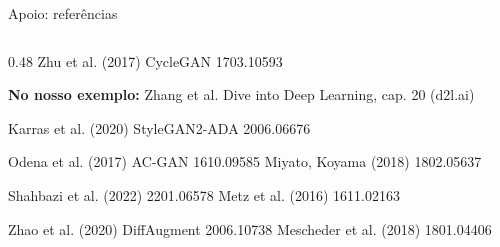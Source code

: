 \documentclass[aspectratio=169,t]{beamer}
\begin{document}
\begin{frame}{Apoio: referências}
\begin{columns}[T,onlytextwidth]
\begin{column}{0.48\textwidth}
      Zhu et al. (2017) CycleGAN 1703.10593\par\smallskip
      \textbf{No nosso exemplo:} Zhang et al. Dive into Deep Learning, cap. 20 (d2l.ai)\par\smallskip
      Karras et al. (2020) StyleGAN2-ADA 2006.06676\par\smallskip
      Odena et al. (2017) AC-GAN 1610.09585 \textperiodcentered{} Miyato, Koyama (2018) 1802.05637\par\smallskip
      Shahbazi et al. (2022) 2201.06578 \textperiodcentered{} Metz et al. (2016) 1611.02163\par\smallskip
      Zhao et al. (2020) DiffAugment 2006.10738 \textperiodcentered{} Mescheder et al. (2018) 1801.04406\par\smallskip
    \end{column}
  \end{columns}
\end{frame}
\end{document}
